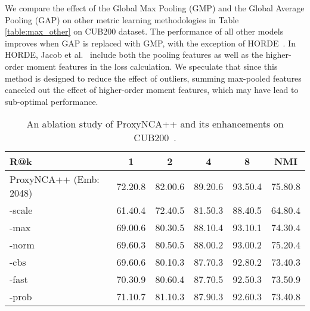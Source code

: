 \documentclass[runningheads]{llncs}
\begin{document}
We compare the effect of the Global Max Pooling (GMP) and the Global Average Pooling (GAP) on other metric learning methodologies \cite{Schroff_2015_CVPR,wu2017sampling,wang2019multi,jacob2019metric} in Table \ref{table:max_other} on CUB200 dataset. The performance of all other models improves when GAP is replaced with GMP, with the exception of HORDE~\cite{jacob2019metric}. In HORDE, Jacob et al.~\cite{jacob2019metric} include both the pooling features as well as the higher-order moment features in the loss calculation. We speculate that since this method is designed to reduce the effect of outliers, summing max-pooled features canceled out the effect of higher-order moment features, which may have lead to sub-optimal performance.



\begin{table}[htb]
\centering
\caption{An ablation study of ProxyNCA++ and its enhancements on CUB200~\cite{wah2011caltech}.  }
\setlength{\tabcolsep}{3pt}
\begin{tabular}{|l|*5c|}
\hline
R@k & 1 & 2 & 4 & 8 & NMI \\
\hline
\small{ProxyNCA++ (Emb: 2048)} & 72.20.8 & 82.00.6 & 89.20.6 & 93.50.4 & 75.80.8 \\
\hspace{0.3cm}\small{-scale}&61.40.4 & 72.40.5 & 81.50.3 & 88.40.5 & 64.80.4 \\
\hspace{0.3cm}\small{-max}& 69.00.6 & 80.30.5 & 88.10.4 & 93.10.1 & 74.30.4 \\
\hspace{0.3cm}\small{-norm}& 69.60.3 & 80.50.5 & 88.00.2 & 93.00.2 & 75.20.4 \\
\hspace{0.3cm}\small{-cbs}& 69.60.6 & 80.10.3 & 87.70.3 & 92.80.2 & 73.40.3 \\
\hspace{0.3cm}\small{-fast}& 70.30.9 & 80.60.4 & 87.70.5 & 92.50.3 & 73.50.9 \\
\hspace{0.3cm}\small{-prob}& 71.10.7 & 81.10.3 & 87.90.3 & 92.60.3 & 73.40.8 \\
\hline
\end{tabular}
\label{table:cub_det}
\end{table}
\end{document}

